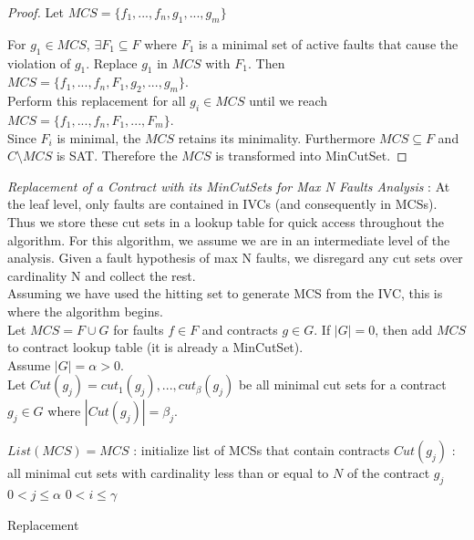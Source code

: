 \begin{theorem}
\begin{proof}
Let $MCS = \{f_1,...,f_n,g_1,...,g_m\}$

For $g_1 \in MCS$, $\exists F_1 \subseteq F$ where $F_1$ is a minimal set of active faults that cause the violation of $g_1$.  Replace $g_1$ in $MCS$ with $F_1$. Then $MCS = \{f_1,...,f_n, F_1,g_2,...,g_m\}$. \\

Perform this replacement for all $g_i \in MCS$ until we reach $MCS = \{f_1,...,f_n,F_1,...,F_m\}$. \\

Since $F_i$ is minimal, the $MCS$ retains its minimality. Furthermore $MCS \subseteq F$ and $C\setminus MCS$ is SAT. Therefore the $MCS$ is transformed into MinCutSet. 

\end{proof}
\end{theorem}

\textit{Replacement of a Contract with its MinCutSets for Max N Faults Analysis} : At the leaf level, only faults are contained in IVCs (and consequently in MCSs). Thus we store these cut sets in a lookup table for quick access throughout the algorithm. For this algorithm, we assume we are in an intermediate level of the analysis. Given a fault hypothesis of max N faults, we disregard any cut sets over cardinality N and collect the rest.\\

Assuming we have used the hitting set to generate MCS from the IVC, this is where the algorithm begins. \\

Let $MCS = F \cup G$ for faults $f \in F$ and contracts $g \in G$. If $|G| = 0$, then add $MCS$ to contract lookup table (it is already a MinCutSet). \\

Assume $|G| = \alpha > 0$.\\

Let $Cut(g_j) = {cut_1(g_j), ..., cut_{\beta}(g_j)}$ be all minimal cut sets for a contract $g_j \in G$ where $|Cut(g_j)|=\beta_j$.\\

\begin{algorithm}
	$List(MCS) = {MCS}$ : initialize list of MCSs that contain contracts \;
	$Cut(g_j)$ : all minimal cut sets with cardinality less than or equal to $N$ of the contract $g_j$ \;
	$0 < j \leq \alpha$ \;
	$0 < i \leq \gamma$ \;
	\caption{Replacement}
	\label{alg:repl_alg}
\end{algorithm}

